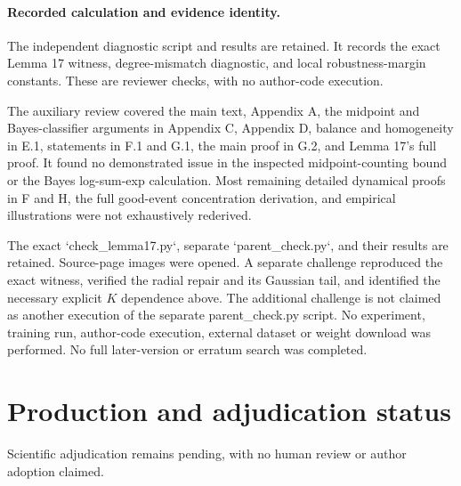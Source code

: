 \documentclass[10pt]{article}
\begin{document}
\paragraph*{Recorded calculation and evidence identity.}\mbox{}\par
The independent diagnostic script and results are retained. It records the exact Lemma 17 witness, degree-mismatch diagnostic, and local robustness-margin constants. These are reviewer checks, with no author-code execution.\par
The auxiliary review covered the main text, Appendix A, the midpoint and Bayes-classifier arguments in Appendix C, Appendix D, balance and homogeneity in E.1, statements in F.1 and G.1, the main proof in G.2, and Lemma 17’s full proof. It found no demonstrated issue in the inspected midpoint-counting bound or the Bayes log-sum-exp calculation. Most remaining detailed dynamical proofs in F and H, the full good-event concentration derivation, and empirical illustrations were not exhaustively rederived.\par
The exact `check\_lemma17.py`, separate `parent\_check.py`, and their results are retained. Source-page images were opened. A separate challenge reproduced the exact witness, verified the radial repair and its Gaussian tail, and identified the necessary explicit \(K\) dependence above. The additional challenge is not claimed as another execution of the separate parent\_check.py script. No experiment, training run, author-code execution, external dataset or weight download was performed. No full later-version or erratum search was completed.\par
\section*{Production and adjudication status}
Scientific adjudication remains pending, with no human review or author adoption claimed.\par
\end{document}
